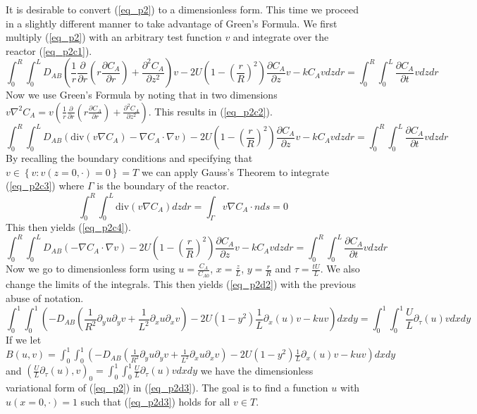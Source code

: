 \documentclass[11pt,fleqn]{article}
\theoremstyle{defstyle}
\begin{document}
It is desirable to convert (\ref{eq_p2}) to a dimensionless form. This time we proceed in a slightly different manner to take advantage of Green's Formula. We first multiply (\ref{eq_p2}) with an arbitrary test function $v$ and integrate over the reactor (\ref{eq_p2c1}). 
\begin{equation}
\int_0^R \int_0^L D_{AB}(\frac{1}{r}\frac{\partial}{\partial r}(r\frac{\partial C_A}{\partial r}) + \frac{\partial^2 C_A}{\partial z^2})v - 2U(1-(\frac{r}{R})^2)\frac{\partial C_A}{\partial z}v - kC_Av dzdr = \int_0^R \int_0^L \frac{\partial C_A}{\partial t}v dzdr
\label{eq_p2c1}
\end{equation}
Now we use Green's Formula by noting that in two dimensions $v\nabla^2C_A = v(\frac{1}{r}\frac{\partial}{\partial r}(r\frac{\partial C_A}{\partial r}) + \frac{\partial^2 C_A}{\partial z^2})$. This results in (\ref{eq_p2c2}).
\begin{equation}
\int_0^R \int_0^L D_{AB}(\text{div}(v\nabla C_A)-\nabla C_A \cdot \nabla v ) - 2U(1-(\frac{r}{R})^2)\frac{\partial C_A}{\partial z}v - kC_Av dzdr = \int_0^R \int_0^L \frac{\partial C_A}{\partial t}v dzdr
\label{eq_p2c2}
\end{equation}
By recalling the boundary conditions and specifying that $v \in \left\{v : v(z=0,\cdot)=0 \right\} = T$ we can apply Gauss's Theorem to integrate (\ref{eq_p2c3}) where $\Gamma$ is the boundary of the reactor.
\begin{equation}
\int_0^R \int_0^L \text{div}(v\nabla C_A)dzdr = \int_\Gamma v\nabla C_A \cdot n ds = 0 
\label{eq_p2c3}
\end{equation}
This then yields (\ref{eq_p2c4}).
\begin{equation}
\int_0^R \int_0^L D_{AB}(-\nabla C_A \cdot \nabla v ) - 2U(1-(\frac{r}{R})^2)\frac{\partial C_A}{\partial z}v - kC_Av dzdr = \int_0^R \int_0^L \frac{\partial C_A}{\partial t}v dzdr
\label{eq_p2c4}
\end{equation}
Now we go to dimensionless form using $u=\frac{C_A}{C_{A0}}$, $x = \frac{z}{L}$, $y = \frac{r}{R}$ and $\tau = \frac{tU}{L}$. We also change the limits of the integrals. This then yields (\ref{eq_p2d2}) with the previous abuse of notation. 
\begin{equation}
\int_0^1 \int_0^1 (-D_{AB}(\frac{1}{R^2}\partial_y u \partial_y v + \frac{1}{L^2}\partial_x u \partial_xv) - 2U(1-y^2)\frac{1}{L}\partial_x(u) v - kuv)dxdy = \int_0^1 \int_0^1 
\frac{U}{L} \partial_\tau(u) v dxdy
\label{eq_p2d2}
\end{equation}
If we let $B(u,v) = \int_0^1 \int_0^1 (-D_{AB}(\frac{1}{R^2}\partial_y u \partial_y v + \frac{1}{L^2}\partial_x u \partial_x v) - 2U(1-y^2)\frac{1}{L}\partial_x(u) v - kuv)dxdy $ and $(\frac{U}{L} \partial_\tau (u), v)_0 = \int_0^1 \int_0^1 \frac{U}{L} \partial_\tau (u) v dxdy$ we have the dimensionless variational form of (\ref{eq_p2}) in (\ref{eq_p2d3}). The goal is to find a function $u$ with $u(x=0,\cdot) = 1$ such that (\ref{eq_p2d3}) holds for all $v \in T$.
\end{document}
